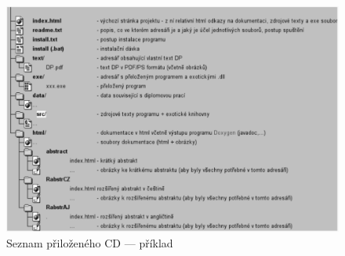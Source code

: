 \documentclass[11pt,twoside,a4paper]{book}
\begin{document}
\begin{figure}[h]
\begin{center}
\includegraphics[width=14cm]{figures/seznamcd}
\caption{Seznam přiloženého CD --- příklad}
\label{fig:seznamcd}
\end{center}
\end{figure}
\end{document}
